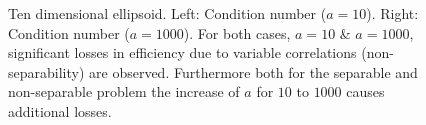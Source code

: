\begin{figure}[h!]
\begin{minipage}[b]{0.5\linewidth}
 \centering
\end{minipage}
\begin{minipage}[b]{0.5\linewidth}
 \centering
\end{minipage}
\caption{Ten dimensional ellipsoid. Left: Condition number ($a=10$).  Right: Condition number ($a=1000$). For both cases, $a=10$ \& $a=1000$, significant losses in efficiency due to variable correlations (non-separability) are observed. Furthermore both for the separable and non-separable problem the increase of $a$ for $10$ to $1000$ causes additional losses.} 
\label{ellipse_t1}
\end{figure}

